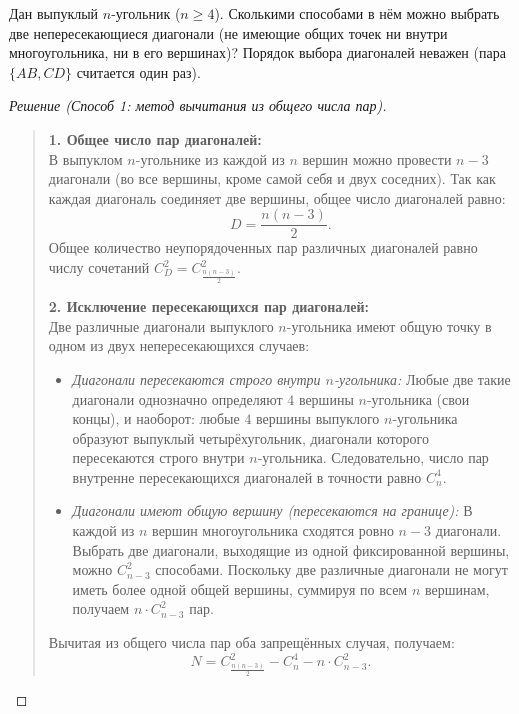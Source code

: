 \begin{problem}
    Дан выпуклый $n$-угольник ($n \ge 4$). Сколькими способами в нём можно 
    выбрать две непересекающиеся диагонали (не имеющие общих точек ни 
    внутри многоугольника, ни в его вершинах)? Порядок выбора диагоналей 
    неважен (пара $\{AB, CD\}$ считается один раз).
\end{problem}

\begin{proof}[Решение (Способ 1: метод вычитания из общего числа пар)]~\\
    \begin{quote}
        \textbf{1. Общее число пар диагоналей:}\\
        В выпуклом $n$-угольнике из каждой из $n$ вершин можно провести 
        $n - 3$ диагонали (во все вершины, кроме самой себя и двух соседних). 
        Так как каждая диагональ соединяет две вершины, общее число 
        диагоналей равно:
        \[
            D = \frac{n(n - 3)}{2}.
        \]
        Общее количество неупорядоченных пар различных диагоналей равно 
        числу сочетаний $C_D^2 = C_{\frac{n(n-3)}{2}}^2$.

        \textbf{2. Исключение пересекающихся пар диагоналей:}\\
        Две различные диагонали выпуклого $n$-угольника имеют общую точку 
        в одном из двух непересекающихся случаев:
        \begin{itemize}
            \item \emph{Диагонали пересекаются строго внутри $n$-угольника:} 
            Любые две такие диагонали однозначно определяют $4$ вершины 
            $n$-угольника (свои концы), и наоборот: любые $4$ вершины 
            выпуклого $n$-угольника образуют выпуклый четырёхугольник, 
            диагонали которого пересекаются строго внутри $n$-угольника. 
            Следовательно, число пар внутренне пересекающихся диагоналей 
            в точности равно $C_n^4$.
            \item \emph{Диагонали имеют общую вершину (пересекаются на 
            границе):} 
            В каждой из $n$ вершин многоугольника сходятся ровно $n - 3$ 
            диагонали. Выбрать две диагонали, выходящие из одной 
            фиксированной вершины, можно $C_{n-3}^2$ способами. Поскольку 
            две различные диагонали не могут иметь более одной общей 
            вершины, суммируя по всем $n$ вершинам, получаем $n \cdot C_{n-3}^2$ 
            пар.
        \end{itemize}
        Вычитая из общего числа пар оба запрещённых случая, получаем:
        \begin{equation} \label{eq:diag_sub_method}
            N = C_{\frac{n(n-3)}{2}}^2 - C_n^4 - n \cdot C_{n-3}^2. \tag{8}
        \end{equation}
    \end{quote}
\end{proof}

